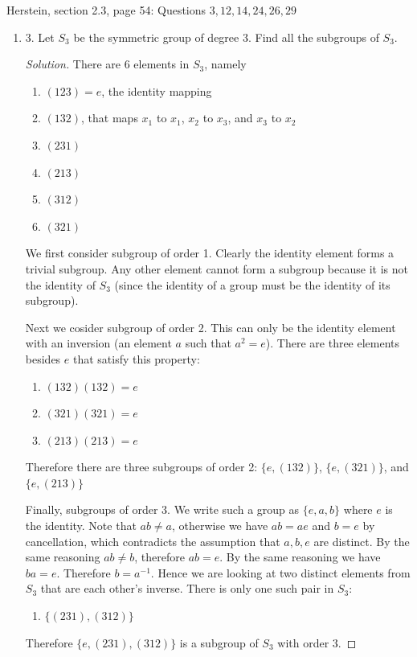 Herstein, section 2.3, page 54: Questions $3,12,14,24,26,29$
\begin{enumerate}[resume]
\item 3. Let $S_3$ be the symmetric group of degree 3. Find all the subgroups of $S_3$.
\begin{proof}[Solution]
	There are 6 elements in $S_3$, namely
	\begin{enumerate}
		\item $(123) = e$, the identity mapping
		\item $(132)$, that maps $x_1$ to $x_1$, $x_2$ to $x_3$, and $x_3$ to $x_2$
		\item $(231)$
		\item $(213)$
		\item $(312)$
		\item $(321)$
	\end{enumerate}

	We first consider subgroup of order 1. Clearly the identity element forms a trivial subgroup. Any other element cannot form a subgroup because it is not the identity of $S_3$ (since the identity of a group must be the identity of its subgroup).

Next we cosider subgroup of order 2. This can only be the identity element with an inversion (an element $a$ such that $a^2 = e$). There are three elements besides $e$ that satisfy this property:
\begin{enumerate}
	\item $(132)(132) = e$
	\item $(321)(321) = e$
	\item $(213)(213) = e$
\end{enumerate}
Therefore there are three subgroups of order 2: $\{e, (132)\}$, $\{e, (321)\}$, and$ \{e, (213)\}$

Finally, subgroups of order 3. We write such a group as $\{e,a,b\} $ where $e$ is the identity. Note that $ab \neq a$, otherwise we have $ab = ae$ and $b = e$ by cancellation, which contradicts the assumption that  $a,b,e$ are distinct. By the same reasoning $ab \neq  b$, therefore $ab = e$. By the same reasoning we have $ba = e$. Therefore $b = a^{-1}$. Hence we are looking at two distinct elements from $S_3$ that are each other's inverse. There is only one such pair in $S_3$:
\begin{enumerate}
	\item $\{(231),(312)\} $ 
\end{enumerate}
Therefore $\{e, (231),(312)\} $ is a subgroup of $S_3$ with order 3.


\end{proof}
\end{enumerate}
